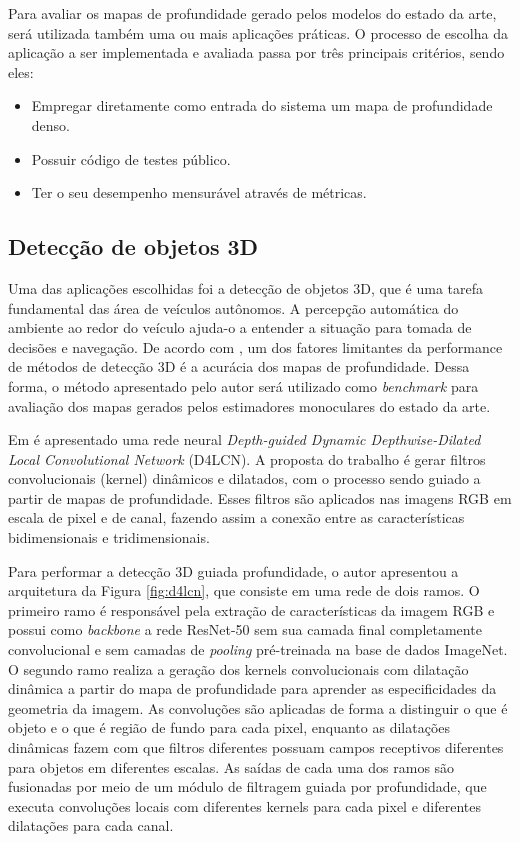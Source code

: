 Para avaliar os mapas de profundidade gerado pelos modelos do estado da arte, será utilizada também uma ou mais aplicações práticas. O processo de escolha da aplicação a ser implementada e avaliada passa por três principais critérios, sendo eles: 

\begin{itemize}
    \item Empregar diretamente como entrada do sistema um mapa de profundidade denso.
    \item Possuir código de testes público.
    \item Ter o seu desempenho mensurável através de métricas. 
\end{itemize}

\subsection{Detecção de objetos 3D}

Uma das aplicações escolhidas foi a detecção de objetos 3D, que é uma tarefa fundamental das área de veículos autônomos. A percepção automática do ambiente ao redor do veículo ajuda-o a entender a situação para tomada de decisões e navegação. De acordo com , um dos fatores limitantes da performance de métodos de detecção 3D é a acurácia dos mapas de profundidade. Dessa forma, o método apresentado pelo autor será utilizado como \textit{benchmark} para avaliação dos mapas gerados pelos estimadores monoculares do estado da arte.

Em  é apresentado uma rede neural \textit{Depth-guided Dynamic Depthwise-Dilated Local Convolutional Network} (D4LCN). A proposta do trabalho é gerar filtros convolucionais (kernel) dinâmicos e dilatados, com o processo sendo guiado a partir de mapas de profundidade. Esses filtros são aplicados nas imagens RGB em escala de pixel e de canal, fazendo assim a conexão entre as características bidimensionais e tridimensionais.


Para performar a detecção 3D guiada profundidade, o autor apresentou a arquitetura da Figura \ref{fig:d4lcn}, que consiste em uma rede de dois ramos. O primeiro ramo é responsável pela extração de características da imagem RGB e possui como \textit{backbone} a rede ResNet-50 sem sua camada final completamente convolucional e sem camadas de \textit{pooling} pré-treinada na base de dados ImageNet. O segundo ramo realiza a geração dos kernels convolucionais com dilatação dinâmica a partir do mapa de profundidade para aprender as especificidades da geometria da imagem. As convoluções são aplicadas de forma a distinguir o que é objeto e o que é região de fundo para cada pixel, enquanto as dilatações dinâmicas fazem com que filtros diferentes possuam campos receptivos diferentes para objetos em diferentes escalas. As saídas de cada uma dos ramos são fusionadas por meio de um módulo de filtragem guiada por profundidade, que executa convoluções locais com diferentes kernels para cada pixel e diferentes dilatações para cada canal. 




